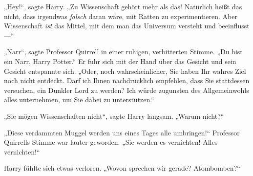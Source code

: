 „Hey!“, sagte Harry. „Zu Wissenschaft gehört mehr als das! Natürlich heißt das nicht, dass irgendwas \emph{falsch} daran wäre, mit Ratten zu experimentieren. Aber Wissenschaft \emph{ist} das Mittel, mit dem man das Universum versteht und beeinflusst—“

„Narr“, sagte Professor Quirrell in einer ruhigen, verbitterten Stimme. „Du bist ein Narr, Harry Potter.“ Er fuhr sich mit der Hand über das Gesicht und sein Gesicht entspannte sich. „Oder, noch wahrscheinlicher, Sie haben Ihr wahres Ziel noch nicht entdeckt. Darf ich Ihnen nachdrücklich empfehlen, dass Sie stattdessen versuchen, ein Dunkler Lord zu werden? Ich würde zugunsten des Allgemeinwohls alles unternehmen, um Sie dabei zu unterstützen.“

„Sie mögen Wissenschaften nicht“, sagte Harry langsam. „Warum nicht?“

„Diese verdammten Muggel werden uns eines Tages alle umbringen!“ Professor Quirrells Stimme war lauter geworden. „Sie werden es vernichten! Alles vernichten!“

Harry fühlte sich etwas verloren. „Wovon sprechen wir gerade? Atombomben?“

